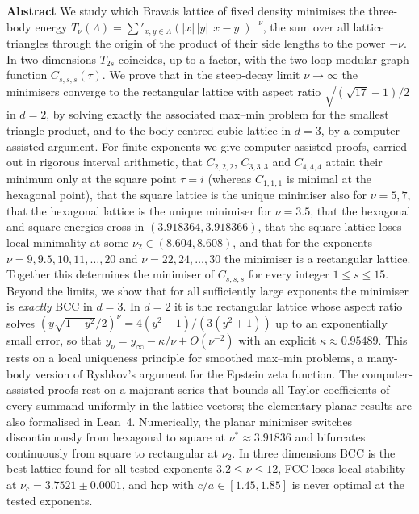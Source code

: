 \documentclass[10pt,twocolumn,a4paper]{article}
\theoremstyle{definition}
\begin{document}
\noindent\textbf{Abstract}\enspace
We study which Bravais lattice of fixed density minimises the three-body energy $T_\nu(\Lambda)=\sum'_{x,y\in\Lambda}(|x|\,|y|\,|x-y|)^{-\nu}$, the sum over all lattice triangles through the origin of the product of their side lengths to the power $-\nu$. In two dimensions $T_{2s}$ coincides, up to a factor, with the two-loop modular graph function $C_{s,s,s}(\tau)$. We prove that in the steep-decay limit $\nu\to\infty$ the minimisers converge to the rectangular lattice with aspect ratio $\sqrt{(\sqrt{17}-1)/2}$ in $d=2$, by solving exactly the associated max--min problem for the smallest triangle product, and to the body-centred cubic lattice in $d=3$, by a computer-assisted argument. For finite exponents we give computer-assisted proofs, carried out in rigorous interval arithmetic, that $C_{2,2,2}$, $C_{3,3,3}$ and $C_{4,4,4}$ attain their minimum only at the square point $\tau=i$ (whereas $C_{1,1,1}$ is minimal at the hexagonal point), that the square lattice is the unique minimiser also for $\nu=5,7$, that the hexagonal lattice is the unique minimiser for $\nu=3.5$, that the hexagonal and square energies cross in $(3.918364,3.918366)$, that the square lattice loses local minimality at some $\nu_2\in(8.604,8.608)$, and that for the exponents $\nu=9,9.5,10,11,\dots,20$ and $\nu=22,24,\dots,30$ the minimiser is a rectangular lattice. Together this determines the minimiser of $C_{s,s,s}$ for every integer $1\le s\le15$. Beyond the limits, we show that for all sufficiently large exponents the minimiser is \emph{exactly} BCC in $d=3$. In $d=2$ it is the rectangular lattice whose aspect ratio solves $(y\sqrt{1+y^2}/2)^\nu=4(y^2-1)/(3(y^2+1))$ up to an exponentially small error, so that $y_\nu=y_\infty-\kappa/\nu+O(\nu^{-2})$ with an explicit $\kappa\approx0.95489$. This rests on a local uniqueness principle for smoothed max--min problems, a many-body version of Ryshkov's argument for the Epstein zeta function. The computer-assisted proofs rest on a majorant series that bounds all Taylor coefficients of every summand uniformly in the lattice vectors; the elementary planar results are also formalised in Lean~4. Numerically, the planar minimiser switches discontinuously from hexagonal to square at $\nu^*\approx3.91836$ and bifurcates continuously from square to rectangular at $\nu_2$. In three dimensions BCC is the best lattice found for all tested exponents $3.2\le\nu\le12$, FCC loses local stability at $\nu_c=3.7521\pm0.0001$, and hcp with $c/a\in[1.45,1.85]$ is never optimal at the tested exponents.
\end{document}
